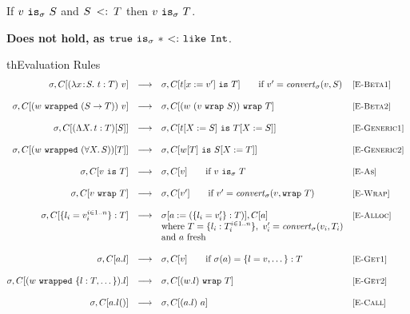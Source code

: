 \documentclass{article}
\newcommand{\fun}[1]{\mbox{\it #1\/}}
\newcommand{\lam}[4]{\lambda#1\!:\!#2.\,\,#4:#3}
\newcommand{\lamt}[2]{#1\rightarrow #2}
\newcommand{\app}[2]{#1~#2}
\newcommand{\Int}{\t{Int}}
\newcommand{\dynamic}{\t{*}}
\newcommand{\Lam}[3]{\Lambda #1.\,#2:#3}
\newcommand{\App}[2]{#1[#2]}
\newcommand{\Lamt}[2]{\forall #1.\,#2}
\newcommand{\cast}[2]{#1~\t{is}~#2}
\newcommand{\subtype}[2]{#1 \,\sword\, #2}
\newcommand{\sword}{\mbox{\,\,$<:$\,\,}}
\newcommand{\convert}[2]{{#1}\convertword{#2}}
\newcommand{\convertword}{\mbox{\,\,$\sim :$\,\,}}
\renewcommand{\t}[1]{{\tt #1}}
\newcommand{\red}[0]{\longrightarrow}  %
\newcommand{\lred}[0]{\red}  %
\newcommand{\objty}[1]{\{#1\}}
\newcommand{\obje}[2]{\{#1\}:{#2}}
\newcommand{\objget}[2]{#1.#2}
\newcommand{\objcall}[2]{#1.#2()}
\newcommand{\wrapty}[1]{\t{wrap}~#1}
\newcommand{\likety}[1]{\t{like}~#1}
\newcommand{\wrapv}[2]{#1~\t{wrapped}~#2}
\newcommand{\wrap}[2]{#1~\t{wrap}~#2}
\renewcommand{\convert}[2]{\fun{convert}_{\sigma}(#1,#2)}
\newcommand{\istype}[2]{#1~\t{is}_{\sigma}~ #2}
\begin{document}
\begin{lemma}
If $\istype v S$ and $\subtype S T$ then $\istype v T$.
\end{lemma}
{\bf Does not hold, as  $\t{true}  \istype{}{} \dynamic \sword \likety \Int$}.


\begin{displayfigure}{th}{Evaluation Rules}
\label{fig:eval} 
\footnotesize
\[
\begin{array}{@{}rcllr}
	\sigma,C[{\app{(\lam{x}{S}{T}{t})}{v}}]
	&\lred&
	\sigma,C[\cast{t[x:=v']}{T}]
	\qquad\mbox{if $v'=\convert v S$}
	&\rel{E-Beta1}
\\~\\
	\sigma,C[{\app{(\wrapv{w}{(\lamt{S}{T})})}
	              {v}}]
	&\lred&
	\sigma,C[\wrap{(w~(\wrap{v}{S}))}{T}]
	&\rel{E-Beta2}
\\~\\
	\sigma,C[{\App{(\Lam{X}{t}{T})}{S}}]
	&\lred&
	\sigma,C[\cast{t[X:=S]}{T[X:=S]}]
	&\rel{E-Generic1}
\\~\\
	\sigma,C[{\App{(\wrapv{w}{(\Lamt{X}{S})})}
		          {T}}]
	&\lred&
	\sigma,C[\cast{\App{w}{T}}{S[X:=T]}]
	&\rel{E-Generic2}
\\~\\
	\sigma,C[\cast{v}{T}]
	&\lred&
	\sigma,C[v]
	\qquad\mbox{if $\istype{v}{T}$}
	&\rel{E-As}
\\~\\
	\sigma,C[\wrap{v}{T}]
	&\lred& 
	\sigma,C[v']
	\qquad\mbox{if $v'=\convert v {\wrapty T}$}
 	&\rel{E-Wrap} 
\\~\\
	\sigma,C[\obje{l_i=v_i^{i\in 1..n}}{T}]
	&\lred&
	\sigma[a:=(\obje{l_i=v'_i}{T})],C[a] 
	&\rel{E-Alloc} \\
	&&\mbox{where }T=\objty{l_i:T_i^{i\in 1..n}}, ~v'_i=\convert{v_i}{T_i} \\
	&&\mbox{and $a$ fresh}
\\~\\
	\sigma,C[\objget{a}{l}]
	&\lred&
	\sigma,C[v]
	\qquad\mbox{if $\sigma(a)=\obje{l=v,\dots}{T}$}
	&\rel{E-Get1}
\\~\\
	\sigma,C[\objget{(\wrapv{w}{\objty{l:T,\dots}})}{l}]
	&\lred&
	\sigma,C[\wrap{(\objget{w}{l})}{T}] 
	&\rel{E-Get2}
\\~\\
	\sigma,C[\objcall{a}{l}]
	&\lred&
	\sigma,C[\app{(\objget a l)} a]
	&\rel{E-Call}

\end{array}\]
\end{displayfigure}
\end{document}

